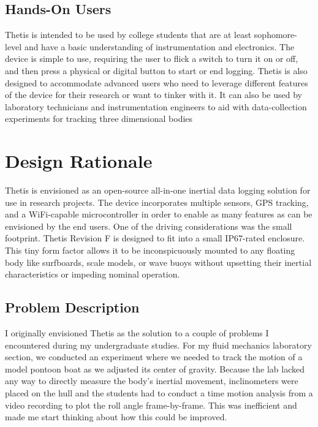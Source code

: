 \subsection{Hands-On Users} 
Thetis is intended to be used by college students that are at least sophomore-level and have a basic understanding of instrumentation and electronics.
The device is simple to use, requiring the user to flick a switch to turn it on or off, and then press a physical or digital button to start or end logging.
Thetis is also designed to accommodate advanced users who need to leverage different features of the device for their research or want to tinker with it.
It can also be used by laboratory technicians and instrumentation engineers to aid with data-collection experiments for tracking three dimensional bodies

\section{Design Rationale} 
Thetis is envisioned as an open-source all-in-one inertial data logging solution for use in research projects.
The device incorporates multiple sensors, GPS tracking, and a WiFi-capable microcontroller in order to enable as many features as can be envisioned by the end users.
One of the driving considerations was the small footprint.
Thetis Revision F is designed to fit into a small IP67-rated enclosure.  
This tiny form factor allows it to be inconspicuously mounted to any floating body like surfboards, scale models, or wave buoys without upsetting their inertial characteristics or impeding nominal operation.

\subsection{Problem Description} 
I originally envisioned Thetis as the solution to a couple of problems I encountered during my undergraduate studies.
For my fluid mechanics laboratory section, we conducted an experiment where we needed to track the motion of a model pontoon boat as we adjusted its center of gravity.
Because the lab lacked any way to directly measure the body's inertial movement, inclinometers were placed on the hull and the students had to conduct a time motion analysis from a video recording to plot the roll angle frame-by-frame.
This was inefficient and made me start thinking about how this could be improved.

